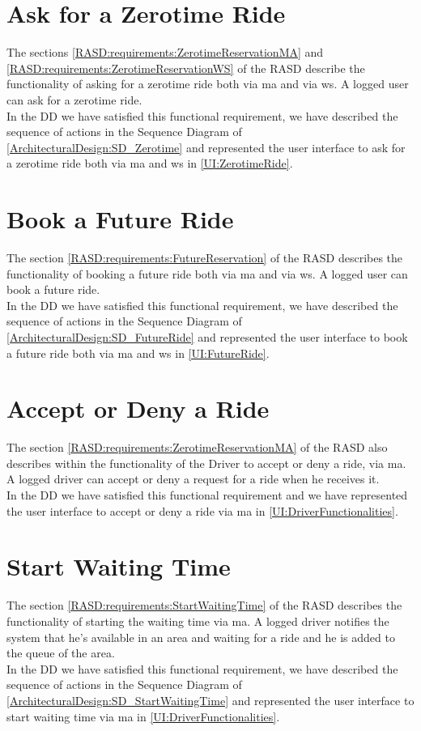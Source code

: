 \documentclass[\mainpath/main]{subfiles}
\begin{document}
\section{Ask for a Zerotime Ride}
The sections \ref{RASD:requirements:ZerotimeReservationMA} and \ref{RASD:requirements:ZerotimeReservationWS} of the RASD describe the functionality of asking for a zerotime ride both via \gls{ma} and via \gls{ws}. A logged user can ask for a zerotime ride.\\
In the DD we have satisfied this functional requirement, we have described the sequence of actions in the Sequence Diagram of \autoref{ArchitecturalDesign:SD_Zerotime} and represented the user interface to ask for a zerotime ride both via \gls{ma} and \gls{ws} in \autoref{UI:ZerotimeRide}.

\section{Book a Future Ride}
The section \ref{RASD:requirements:FutureReservation} of the RASD describes the functionality of booking a future ride both via \gls{ma} and via \gls{ws}. A logged user can book a future ride.\\
In the DD we have satisfied this functional requirement, we have described the sequence of actions in the Sequence Diagram of \autoref{ArchitecturalDesign:SD_FutureRide} and represented the user interface to book a future ride both via \gls{ma} and \gls{ws} in \autoref{UI:FutureRide}.

\section{Accept or Deny a Ride}
The section \ref{RASD:requirements:ZerotimeReservationMA} of the RASD also describes within the functionality of the Driver to accept or deny a ride, via \gls{ma}. A logged driver can accept or deny a request for a ride when he receives it.\\
In the DD we have satisfied this functional requirement and we have represented the user interface to accept or deny a ride via \gls{ma} in \autoref{UI:DriverFunctionalities}.

\section{Start Waiting Time}
The section \ref{RASD:requirements:StartWaitingTime} of the RASD describes the functionality of starting the waiting time via \gls{ma}. A logged driver notifies the system that he's available in an area and waiting for a ride and he is added to the queue of the area.\\
In the DD we have satisfied this functional requirement, we have described the sequence of actions in the Sequence Diagram of \autoref{ArchitecturalDesign:SD_StartWaitingTime} and represented the user interface to start waiting time via \gls{ma} in \autoref{UI:DriverFunctionalities}.
\end{document}
